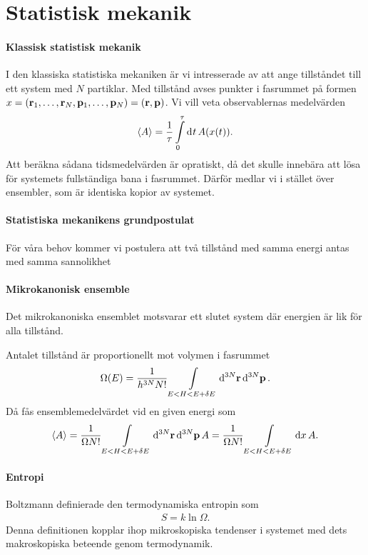 \section{Statistisk mekanik}

\paragraph{Klassisk statistisk mekanik}
I den klassiska statistiska mekaniken är vi intresserade av att ange tillståndet till ett system med $N$ partiklar. Med tillstånd avses punkter i fasrummet på formen $x = (\vb{r}_{1}, \dots, \vb{r}_{N}, \vb{p}_{1}, \dots, \vb{p}_{N}) = (\vb{r}, \vb{p})$. Vi vill veta observablernas medelvärden
\begin{align*}
	\expval{A} = \frac{1}{\tau}\int\limits_{0}^{\tau}\dd[]{t}A(x(t)).
\end{align*}
Att beräkna sådana tidsmedelvärden är opratiskt, då det skulle innebära att lösa för systemets fullständiga bana i fasrummet. Därför medlar vi i stället över ensembler, som är identiska kopior av systemet.

\paragraph{Statistiska mekanikens grundpostulat}
För våra behov kommer vi postulera att två tillstånd med samma energi antas med samma sannolikhet

\paragraph{Mikrokanonisk ensemble}
Det mikrokanoniska ensemblet motsvarar ett slutet system där energien är lik för alla tillstånd.

Antalet tillstånd är proportionellt mot volymen i fasrummet
\begin{align*}
	\Omega(E) = \frac{1}{h^{3N}N!}\int\limits_{E < H < E + \delta E}\dd[3N]{\vb{r}}\dd[3N]{\vb{p}}.
\end{align*}
Då fås ensemblemedelvärdet vid en given energi som
\begin{align*}
	\expval{A} = \frac{1}{\Omega N!}\int\limits_{E < H < E + \delta E}\dd[3N]{\vb{r}}\dd[3N]{\vb{p}}A = \frac{1}{\Omega N!}\int\limits_{E < H < E + \delta E}\dd{x}A.
\end{align*}

\paragraph{Entropi}
Boltzmann definierade den termodynamiska entropin som
\begin{align*}
	S = k\ln{\Omega}.
\end{align*}
Denna definitionen kopplar ihop mikroskopiska tendenser i systemet med dets makroskopiska beteende genom termodynamik.


